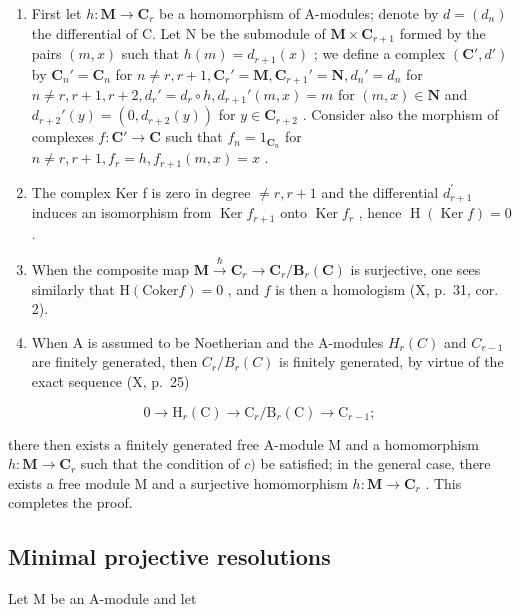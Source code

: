 \begin{enumerate}
\def\labelenumi{\alph{enumi})}
\item
  First let \(h: \mathbf{M} \to \mathbf{C}_r\) be a homomorphism of A-modules; denote by \(d = (d_n)\) the differential of C. Let N be the submodule of \(\mathbf{M} \times \mathbf{C}_{r+1}\) formed by the pairs \((m, x)\) such that \(h(m) = d_{r+1}(x)\) ; we define a complex \((\mathbf{C}', d')\) by \(\mathbf{C}_n' = \mathbf{C}_n\) for \(n \neq r, r+1, \mathbf{C}_r' = \mathbf{M}, \mathbf{C}_{r+1}' = \mathbf{N}, d_n' = d_n\) for \(n \neq r, r+1, r+2, d_r' = d_r \circ h, d_{r+1}'(m, x) = m\) for \((m, x) \in \mathbf{N}\) and \(d_{r+2}'(y) = (0, d_{r+2}(y))\) for \(y \in \mathbf{C}_{r+2}\) . Consider also the morphism of complexes \(f: \mathbf{C}' \to \mathbf{C}\) such that \(f_n = 1_{\mathbf{C}_n}\) for \(n \neq r, r+1, f_r = h, f_{r+1}(m, x) = x\) .
\item
  The complex Ker f is zero in degree \(\neq r, r + 1\) and the differential \(d_{r+1}^{\prime}\) induces an isomorphism from \(\operatorname{Ker} f_{r+1}\) onto \(\operatorname{Ker} f_r\) , hence \(\operatorname{H}(\operatorname{Ker} f) = 0\) .
\item
  When the composite map \(\mathbf{M} \xrightarrow{\hbar} \mathbf{C}_r \to \mathbf{C}_r / \mathbf{B}_r(\mathbf{C})\) is surjective, one sees similarly that \(\mathrm{H}(\mathrm{Coker}f) = 0\) , and \(f\) is then a homologism (X, p.~31, cor. 2).
\item
  When A is assumed to be Noetherian and the A-modules \(H_{r}(C)\) and \(C_{r-1}\) are finitely generated, then \(C_{r}/B_{r}(C)\) is finitely generated, by virtue of the exact sequence (X, p.~25)
\end{enumerate}

\[
0 \to \mathrm{H} _ {r} (\mathrm{C}) \to \mathrm{C} _ {r} / \mathrm{B} _ {r} (\mathrm{C}) \to \mathrm{C} _ {r - 1};
\]

there then exists a finitely generated free A-module M and a homomorphism \(h: \mathbf{M} \to \mathbf{C}_{r}\) such that the condition of \(c)\) be satisfied; in the general case, there exists a free module M and a surjective homomorphism \(h: \mathbf{M} \to \mathbf{C}_{r}\) . This completes the proof.

\subsection{Minimal projective resolutions}

Let M be an A-module and let

